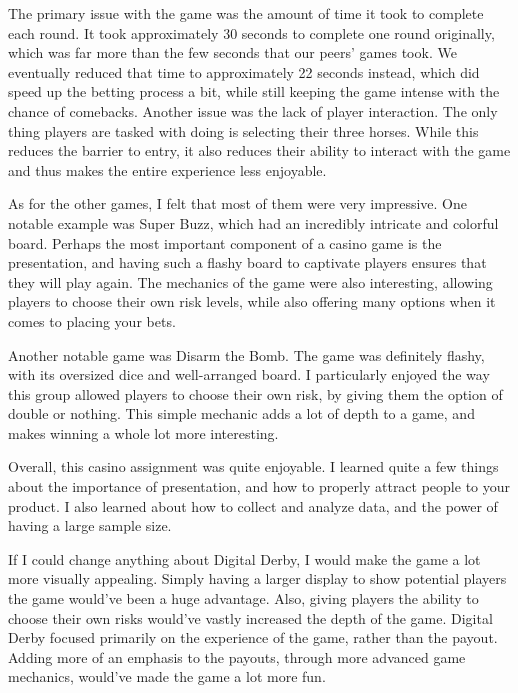 \documentclass{article}
\begin{document}
{{\vspace{2ex}

The primary issue with the game was the amount of time it took to complete each round. It took approximately 30 seconds to complete one round originally, which was far more than the few seconds that our peers’ games took. We eventually reduced that time to approximately 22 seconds instead, which did speed up the betting process a bit, while still keeping the game intense with the chance of comebacks. Another issue was the lack of player interaction. The only thing players are tasked with doing is selecting their three horses. While this reduces the barrier to entry, it also reduces their ability to interact with the game and thus makes the entire experience less enjoyable. 

\vspace{2ex}

As for the other games, I felt that most of them were very impressive. One notable example was Super Buzz, which had an incredibly intricate and colorful board. Perhaps the most important component of a casino game is the presentation, and having such a flashy board to captivate players ensures that they will play again. The mechanics of the game were also interesting, allowing players to choose their own risk levels, while also offering many options when it comes to placing your bets.

\vspace{2ex}

Another notable game was Disarm the Bomb. The game was definitely flashy, with its oversized dice and well-arranged board. I particularly enjoyed the way this group allowed players to choose their own risk, by giving them the option of double or nothing. This simple mechanic adds a lot of depth to a game, and makes winning a whole lot more interesting. 

\vspace{2ex}

Overall, this casino assignment was quite enjoyable. I learned quite a few things about the importance of presentation, and how to properly attract people to your product. I also learned about how to collect and analyze data, and the power of having a large sample size. 

\vspace{2ex}

If I could change anything about Digital Derby, I would make the game a lot more visually appealing. Simply having a larger display to show potential players the game would’ve been a huge advantage. Also, giving players the ability to choose their own risks would’ve vastly increased the depth of the game. Digital Derby focused primarily on the experience of the game, rather than the payout. Adding more of an emphasis to the payouts, through more advanced game mechanics, would’ve made the game a lot more fun. 

}}
\end{document}
